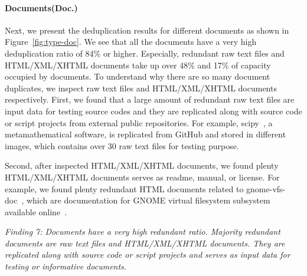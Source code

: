 \paragraph{Documents(Doc.)}

Next, we present the deduplication results for different documents as shown in Figure~\ref{fig:type-doc}. 
We see that all the documents have a very high deduplication ratio of 84\% or higher.
Especially, redundant raw text files and HTML/XML/XHTML documents take up over 48\% and 17\% of capacity occupied by documents. To understand why there are so many document duplicates, we inspect raw text files and HTML/XML/XHTML documents respectively. First, we found that a large amount of redundant raw text files are input data for testing source codes and 
they are replicated along with source code or script projects from external public repositories. 
For example, scipy~\cite{xxx}, a metamathematical software, is replicated from GitHub and stored in different images, which contains over 30 raw text files for testing purpose.

Second, after inspected HTML/XML/XHTML documents, we found plenty HTML/XML/XHTML documents serves as readme, manual, or license. For example, we found plenty redundant HTML documents related to  gnome-vfs-doc~\cite{xxx}, which are documentation for GNOME virtual filesystem subsystem available online~\cite{xxx}.

\textit{Finding 7: Documents have a very high redundant ratio. Majority redundant documents are raw text files and HTML/XML/XHTML documents. They are replicated along with source code or script projects and serves as input data for testing or informative documents.}


%

